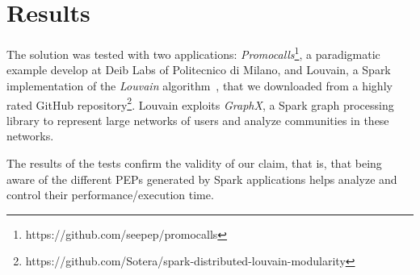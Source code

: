 \section*{Results }
The solution was tested with two applications:  \textit{Promocalls}\footnote{https://github.com/seepep/promocalls}, a paradigmatic example  develop at Deib Labs of Politecnico di Milano, and Louvain, a Spark implementation of the \textit{Louvain} algorithm~\cite{Louvain}, that we downloaded from a highly rated GitHub repository\footnote{https://github.com/Sotera/spark-distributed-louvain-modularity}. Louvain exploits \textit{GraphX}, a Spark graph processing library to represent large networks of users and analyze communities in these networks. 

The results of the tests confirm the validity of our claim, that is, that being aware of the different PEPs generated by Spark applications helps analyze and control their performance/execution time.
